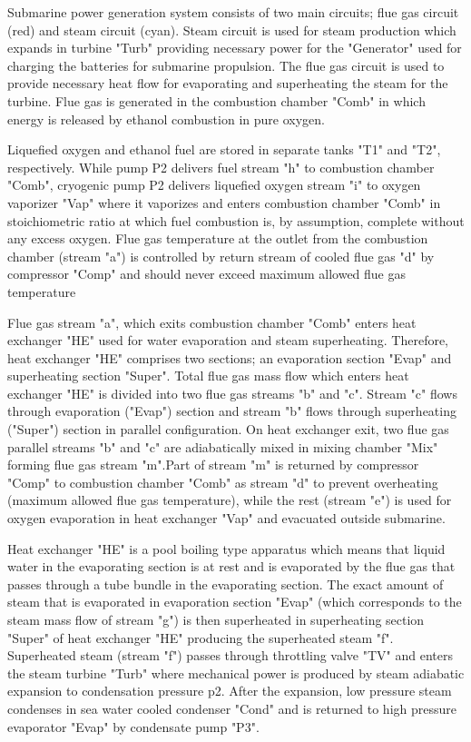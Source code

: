 \documentclass{article}
\begin{document}
	Submarine power generation system consists of two main circuits; flue gas circuit (red) and steam circuit (cyan). Steam circuit is used for steam production which expands in turbine "Turb" providing necessary power for the "Generator" used for charging the batteries for submarine propulsion. The flue gas circuit is used to provide necessary heat flow for evaporating and superheating the steam for the turbine. Flue gas is generated in the combustion chamber "Comb" in which energy is released by ethanol combustion in pure oxygen.
	
	Liquefied oxygen and ethanol fuel are stored in separate tanks "T1" and "T2", respectively. While pump P2 delivers fuel stream "h" to combustion chamber "Comb", cryogenic pump P2 delivers liquefied oxygen stream "i" to oxygen vaporizer "Vap" where it vaporizes and enters combustion chamber "Comb" in stoichiometric ratio at which fuel combustion is, by assumption, complete without any excess oxygen. Flue gas temperature at the outlet from the combustion chamber (stream "a") is controlled by return stream of cooled flue gas "d" by compressor "Comp" and should never exceed maximum allowed flue gas temperature %
	
	Flue gas stream "a", which exits combustion chamber "Comb" enters heat exchanger "HE" used for water evaporation and steam superheating. Therefore, heat exchanger "HE" comprises two sections; an evaporation section "Evap" and superheating section "Super". Total flue gas mass flow which enters heat exchanger "HE" is divided into two flue gas streams "b" and "c". Stream "c" flows through evaporation ("Evap") section and stream "b" flows through superheating ("Super") section in parallel configuration. On heat exchanger exit, two flue gas parallel streams "b" and "c" are adiabatically mixed in mixing chamber "Mix" forming flue gas stream "m".Part of stream "m" is returned by compressor "Comp" to combustion chamber "Comb" as stream "d" to prevent overheating (maximum allowed flue gas temperature), while the rest (stream "e") is used for oxygen evaporation in heat exchanger "Vap" and evacuated outside submarine.
	  
	Heat exchanger "HE" is a pool boiling type apparatus which means that liquid water in the evaporating section is at rest and is evaporated by the flue gas that passes through a tube bundle in the evaporating section. The exact amount of steam that is evaporated in evaporation section "Evap" (which corresponds to the steam mass flow of stream "g") is then superheated in superheating section "Super" of heat exchanger "HE" producing the superheated steam "f". Superheated steam (stream "f") passes through throttling valve "TV" and enters the steam turbine "Turb" where mechanical power is produced by steam adiabatic expansion to condensation pressure p2. After the expansion, low pressure steam condenses in sea water cooled condenser "Cond" and is returned to high pressure evaporator "Evap" by condensate pump "P3". 
	
\end{document}
